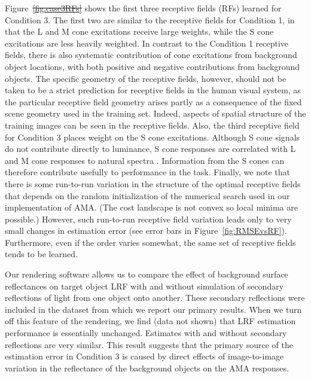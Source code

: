 \documentclass{jov}
\providecommand{\DIFaddtex}[1]{{\protect\color{blue}\uwave{#1}}} %
\providecommand{\DIFdeltex}[1]{{\protect\color{red}\sout{#1}}}                      %
\providecommand{\DIFaddbegin}{} %
\providecommand{\DIFaddend}{} %
\providecommand{\DIFdelbegin}{} %
\providecommand{\DIFdelend}{} %
\providecommand{\DIFadd}[1]{\texorpdfstring{\DIFaddtex{#1}}{#1}} %
\providecommand{\DIFdel}[1]{\texorpdfstring{\DIFdeltex{#1}}{}} %
\newcommand{\DIFscaledelfig}{0.5}
\newlength{\DIFdelgraphicswidth} %
\newlength{\DIFdelgraphicsheight} %
\newcommand{\DIFaddincludegraphics}[2][]{{\color{blue}\fbox{\DIFOincludegraphics[#1]{#2}}}} %
\newcommand{\DIFdelincludegraphics}[2][]{%
\sbox{\DIFdelgraphicsbox}{\DIFOincludegraphics[#1]{#2}}%
\settoboxwidth{\DIFdelgraphicswidth}{\DIFdelgraphicsbox} %
\settoboxtotalheight{\DIFdelgraphicsheight}{\DIFdelgraphicsbox} %
\scalebox{\DIFscaledelfig}{%
\parbox[b]{\DIFdelgraphicswidth}{\usebox{\DIFdelgraphicsbox}\\[-\baselineskip] \rule{\DIFdelgraphicswidth}{0em}}\llap{\resizebox{\DIFdelgraphicswidth}{\DIFdelgraphicsheight}{%
\setlength{\unitlength}{\DIFdelgraphicswidth}%
\begin{picture}(1,1)%
\thicklines\linethickness{2pt} %
{\color[rgb]{1,0,0}\put(0,0){\framebox(1,1){}}}%
{\color[rgb]{1,0,0}\put(0,0){\line( 1,1){1}}}%
{\color[rgb]{1,0,0}\put(0,1){\line(1,-1){1}}}%
\end{picture}%
}\hspace*{3pt}}} %
} %
\DeclareRobustCommand{\DIFaddbegin}{\DIFOaddbegin \let\includegraphics\DIFaddincludegraphics} %
\DeclareRobustCommand{\DIFaddend}{\DIFOaddend \let\includegraphics\DIFOincludegraphics} %
\DeclareRobustCommand{\DIFdelbegin}{\DIFOdelbegin \let\includegraphics\DIFdelincludegraphics} %
\DeclareRobustCommand{\DIFdelend}{\DIFOaddend \let\includegraphics\DIFOincludegraphics} %
\begin{document}
Figure~\DIFdelbegin \DIFdel{\ref{fig:case3RFs} }\DIFdelend \DIFaddbegin \DIFadd{\ref{fig:Condition3}c }\DIFaddend shows the first three receptive fields (RFs) learned for Condition 3.
The first two are similar to the receptive fields for Condition 1, in that the L and M cone excitations receive large weights, while the S cone excitations are less heavily weighted.
In contrast to the Condition 1 receptive fields, there is also systematic contribution of cone excitations from background object locations, with both positive and negative contributions from background objects. 
The specific geometry of the receptive fields, however, should not be taken to be a strict prediction for receptive fields in the human visual system, as the particular receptive field geometry arises partly as a consequence of the fixed scene geometry used in the training set. 
Indeed, aspects of spatial structure of the training images can be seen in the receptive fields. 
Also, the third receptive field for Condition 3 places weight on the S cone excitations.
Although S cone signals do not contribute directly to luminance,  S cone responses are correlated with
L and M cone responses to natural spectra \cite{burton1987color, benson2014unsupervised}.
Information from the S cones can therefore contribute usefully to performance in the task. 
Finally, we note that there is some run-to-run variation in the structure of the optimal receptive fields that depends on the random initialization of the numerical search used in our implementation of AMA. 
(The cost landscape is not convex so local minima are possible.) 
However, such run-to-run receptive field variation leads only to very small changes in estimation error (see error bars in Figure~\ref{fig:RMSEvsRF}). 
Furthermore, even if the order varies somewhat, the same set of receptive fields tends to be learned.

Our rendering software allows us to compare the effect of background surface reflectances on target object LRF with and without simulation of secondary reflections of light from one object onto another. 
These secondary reflections were included in the dataset from which we report our primary results. 
When we turn off this feature of the rendering, we find (data not shown) that LRF estimation performance is essentially unchanged. 
Estimates with and without secondary reflections are very similar. 
This result suggests that the primary source of the estimation error in Condition 3 is caused by direct effects of image-to-image variation in the reflectance of the background objects on the AMA responses.
\end{document}
